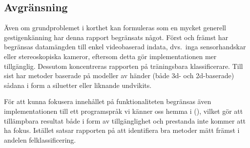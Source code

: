 \documentclass[../rapport_MVEX01-11-05]{subfiles}
\begin{document}
\subsection{Avgränsning}

Även om grundproblemet i korthet kan formuleras som en mycket generell
gestigenkänning har denna rapport begränsats något. Först och främst
har begränsas datamängden till enkel videobaserad indata, dvs.~inga sensorhandskar
eller stereoskopiska kameror, eftersom detta gör implementationen mer
tillgänglig. Dessutom koncentreras rapporten på träningsbara
klassificerare. Till sist har metoder baserade på modeller av händer (både
3d- och 2d-baserade) sådana i form a siluetter eller liknande undvikits.

För att kunna fokusera innehållet på funktionaliteten begränsas även
implementationen till ett programspråk vi känner oss hemma i (\MATLAB), vilket gör att
tillämpbara resultat både i form av tillgänglighet och prestanda inte kommer
att ha fokus. Istället satsar rapporten på att identifiera bra metoder mätt
främst i andelen felklassificering.

\end{document}
